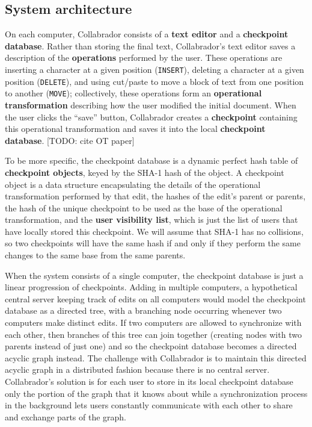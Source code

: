 \documentclass[11pt,titlepage]{article}
\begin{document}
\subsection{System architecture}

On each computer, Collabrador consists of a \textbf{text editor} and a
\textbf{checkpoint database}. Rather than storing the final text,
Collabrador's text editor saves a description of the
\textbf{operations} performed by the user. These operations are
inserting a character at a given position (\texttt{INSERT}), deleting
a character at a given position (\texttt{DELETE}), and using cut/paste
to move a block of text from one position to another (\texttt{MOVE});
collectively, these operations form an \textbf{operational
  transformation} describing how the user modified the initial
document. When the user clicks the ``save'' button, Collabrador
creates a \textbf{checkpoint} containing this operational
transformation and saves it into the local \textbf{checkpoint
  database}. [TODO: cite OT paper]

To be more specific, the checkpoint database is a dynamic perfect hash
table of \textbf{checkpoint objects}, keyed by the SHA-1 hash of the
object. A checkpoint object is a data structure encapsulating the
details of the operational transformation performed by that edit, the
hashes of the edit's parent or parents, the hash of the unique
checkpoint to be used as the base of the operational transformation,
and the \textbf{user visibility list}, which is just the list of users
that have locally stored this checkpoint. We will assume that SHA-1
has no collisions, so two checkpoints will have the same hash if and
only if they perform the same changes to the same base from the same
parents.

When the system consists of a single computer, the checkpoint database
is just a linear progression of checkpoints. Adding in multiple
computers, a hypothetical central server keeping track of edits on all
computers would model the checkpoint database as a directed tree, with
a branching node occurring whenever two computers make distinct
edits. If two computers are allowed to synchronize with each other,
then branches of this tree can join together (creating nodes with two
parents instead of just one) and so the checkpoint database becomes a
directed acyclic graph instead. The challenge with Collabrador is to
maintain this directed acyclic graph in a distributed fashion because
there is no central server. Collabrador's solution is for each user to
store in its local checkpoint database only the portion of the graph
that it knows about while a synchronization process in the background
lets users constantly communicate with each other to share and
exchange parts of the graph.
\end{document}
